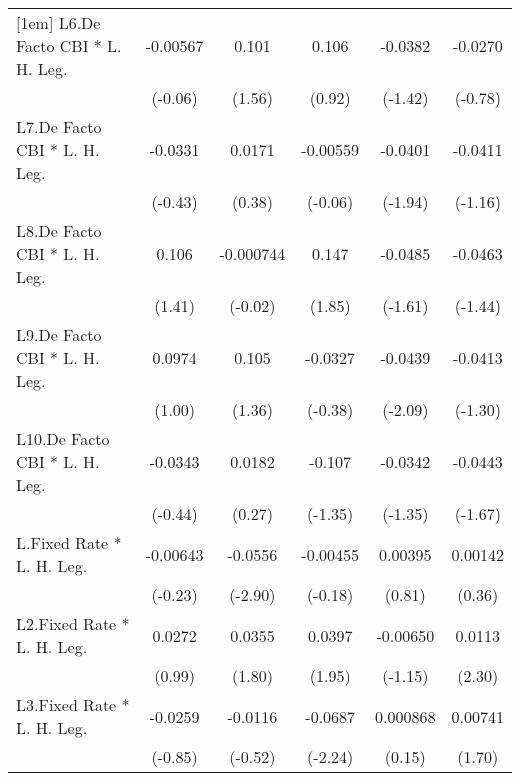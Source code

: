 {\begin{longtable}{l*{5}{c}}
[1em]
L6.De Facto CBI * L. H. Leg.& -0.00567         &    0.101         &    0.106         &  -0.0382         &  -0.0270         \\
                &  (-0.06)         &   (1.56)         &   (0.92)         &  (-1.42)         &  (-0.78)         \\
[1em]
L7.De Facto CBI * L. H. Leg.&  -0.0331         &   0.0171         & -0.00559         &  -0.0401         &  -0.0411         \\
                &  (-0.43)         &   (0.38)         &  (-0.06)         &  (-1.94)         &  (-1.16)         \\
[1em]
L8.De Facto CBI * L. H. Leg.&    0.106         &-0.000744         &    0.147         &  -0.0485         &  -0.0463         \\
                &   (1.41)         &  (-0.02)         &   (1.85)         &  (-1.61)         &  (-1.44)         \\
[1em]
L9.De Facto CBI * L. H. Leg.&   0.0974         &    0.105         &  -0.0327         &  -0.0439\sym{*}  &  -0.0413         \\
                &   (1.00)         &   (1.36)         &  (-0.38)         &  (-2.09)         &  (-1.30)         \\
[1em]
L10.De Facto CBI * L. H. Leg.&  -0.0343         &   0.0182         &   -0.107         &  -0.0342         &  -0.0443         \\
                &  (-0.44)         &   (0.27)         &  (-1.35)         &  (-1.35)         &  (-1.67)         \\
[1em]
L.Fixed Rate * L. H. Leg.& -0.00643         &  -0.0556\sym{**} & -0.00455         &  0.00395         &  0.00142         \\
                &  (-0.23)         &  (-2.90)         &  (-0.18)         &   (0.81)         &   (0.36)         \\
[1em]
L2.Fixed Rate * L. H. Leg.&   0.0272         &   0.0355         &   0.0397         & -0.00650         &   0.0113\sym{*}  \\
                &   (0.99)         &   (1.80)         &   (1.95)         &  (-1.15)         &   (2.30)         \\
[1em]
L3.Fixed Rate * L. H. Leg.&  -0.0259         &  -0.0116         &  -0.0687\sym{*}  & 0.000868         &  0.00741         \\
                &  (-0.85)         &  (-0.52)         &  (-2.24)         &   (0.15)         &   (1.70)         \\

\end{longtable}}
